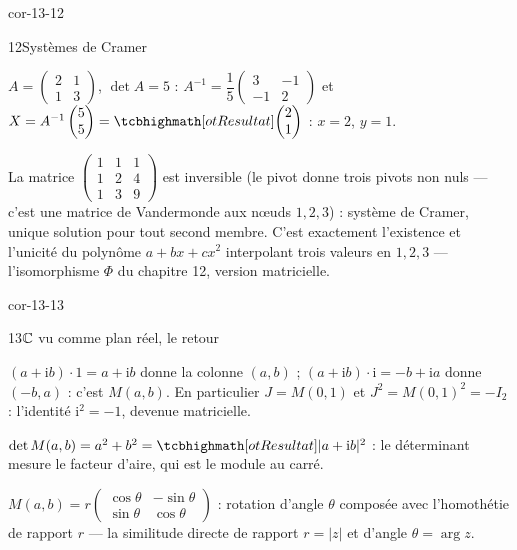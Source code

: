 \begin{blocLivre}{cor-13-12}
\begin{corrige}{12}{Systèmes de Cramer}
\begin{questions}
  \item $A=\begin{pmatrix}2&1\\1&3\end{pmatrix}$, $\det A=5$ :
    $A^{-1}=\dfrac15\begin{pmatrix}3&-1\\-1&2\end{pmatrix}$ et
    $X=A^{-1}\begin{pmatrix}5\\5\end{pmatrix}=\res{\begin{pmatrix}2\\1\end{pmatrix}}$ :
    $x=2$, $y=1$.
  \item La matrice $\begin{pmatrix}1&1&1\\1&2&4\\1&3&9\end{pmatrix}$ est
    inversible (le pivot donne trois pivots non nuls — c'est une matrice
    de Vandermonde aux nœuds $1,2,3$) : système de Cramer, unique
    solution pour tout second membre. C'est exactement l'existence et
    l'unicité du polynôme $a+bx+cx^{2}$ interpolant trois valeurs en
    $1,2,3$ — l'isomorphisme $\Phi$ du chapitre 12, version matricielle.
\end{questions}
\end{corrige}
\end{blocLivre}

\begin{blocLivre}{cor-13-13}
\begin{corrige}{13}{$\mathbb{C}$ vu comme plan réel, le retour}
\begin{questions}
  \item $(a+\mathrm{i}b)\cdot1=a+\mathrm{i}b$ donne la colonne $(a,b)$ ;
    $(a+\mathrm{i}b)\cdot\mathrm{i}=-b+\mathrm{i}a$ donne $(-b,a)$ : c'est
    $M(a,b)$. En particulier $J=M(0,1)$ et
    $J^{2}=M(0,1)^{2}=-I_2$ : l'identité $\mathrm{i}^{2}=-1$, devenue
    matricielle.
  \item $\det M(a,b)=a^{2}+b^{2}=\res{|a+\mathrm{i}b|^{2}}$ : le
    déterminant mesure le facteur d'aire, qui est le module au carré.
  \item $M(a,b)=r\begin{pmatrix}\cos\theta&-\sin\theta\\
    \sin\theta&\cos\theta\end{pmatrix}$ : rotation d'angle $\theta$
    composée avec l'homothétie de rapport $r$ — la similitude directe de
    rapport $r=|z|$ et d'angle $\theta=\arg z$.
\end{questions}
\end{corrige}
\end{blocLivre}

